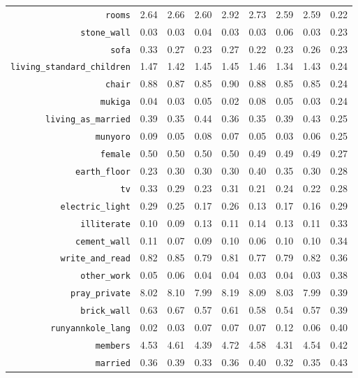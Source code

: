 \begin{longtable}{rrrrrrrrr}
  {\texttt{rooms}} & 2.64 & 2.66 & 2.60 & 2.92 & 2.73 & 2.59 & 2.59 & 0.22 \\ 
  {\texttt{stone\_wall}} & 0.03 & 0.03 & 0.04 & 0.03 & 0.03 & 0.06 & 0.03 & 0.23 \\ 
  {\texttt{sofa}} & 0.33 & 0.27 & 0.23 & 0.27 & 0.22 & 0.23 & 0.26 & 0.23 \\ 
  {\texttt{living\_standard\_children}} & 1.47 & 1.42 & 1.45 & 1.45 & 1.46 & 1.34 & 1.43 & 0.24 \\ 
  {\texttt{chair}} & 0.88 & 0.87 & 0.85 & 0.90 & 0.88 & 0.85 & 0.85 & 0.24 \\ 
  {\texttt{mukiga}} & 0.04 & 0.03 & 0.05 & 0.02 & 0.08 & 0.05 & 0.03 & 0.24 \\ 
  {\texttt{living\_as\_married}} & 0.39 & 0.35 & 0.44 & 0.36 & 0.35 & 0.39 & 0.43 & 0.25 \\ 
  {\texttt{munyoro}} & 0.09 & 0.05 & 0.08 & 0.07 & 0.05 & 0.03 & 0.06 & 0.25 \\ 
  {\texttt{female}} & 0.50 & 0.50 & 0.50 & 0.50 & 0.49 & 0.49 & 0.49 & 0.27 \\ 
  {\texttt{earth\_floor}} & 0.23 & 0.30 & 0.30 & 0.30 & 0.40 & 0.35 & 0.30 & 0.28 \\ 
  {\texttt{tv}} & 0.33 & 0.29 & 0.23 & 0.31 & 0.21 & 0.24 & 0.22 & 0.28 \\ 
  {\texttt{electric\_light}} & 0.29 & 0.25 & 0.17 & 0.26 & 0.13 & 0.17 & 0.16 & 0.29 \\ 
  {\texttt{illiterate}} & 0.10 & 0.09 & 0.13 & 0.11 & 0.14 & 0.13 & 0.11 & 0.33 \\ 
  {\texttt{cement\_wall}} & 0.11 & 0.07 & 0.09 & 0.10 & 0.06 & 0.10 & 0.10 & 0.34 \\ 
  {\texttt{write\_and\_read}} & 0.82 & 0.85 & 0.79 & 0.81 & 0.77 & 0.79 & 0.82 & 0.36 \\ 
  {\texttt{other\_work}} & 0.05 & 0.06 & 0.04 & 0.04 & 0.03 & 0.04 & 0.03 & 0.38 \\ 
  {\texttt{pray\_private}} & 8.02 & 8.10 & 7.99 & 8.19 & 8.09 & 8.03 & 7.99 & 0.39 \\ 
  {\texttt{brick\_wall}} & 0.63 & 0.67 & 0.57 & 0.61 & 0.58 & 0.54 & 0.57 & 0.39 \\ 
  {\texttt{runyannkole\_lang}} & 0.02 & 0.03 & 0.07 & 0.07 & 0.07 & 0.12 & 0.06 & 0.40 \\ 
  {\texttt{members}} & 4.53 & 4.61 & 4.39 & 4.72 & 4.58 & 4.31 & 4.54 & 0.42 \\ 
  {\texttt{married}} & 0.36 & 0.39 & 0.33 & 0.36 & 0.40 & 0.32 & 0.35 & 0.43 \\ 

\end{longtable}
